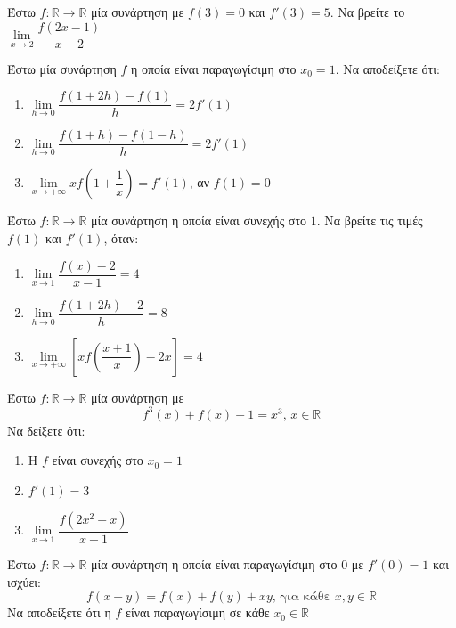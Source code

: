 \documentclass{presentation}
\begin{document}
\begin{askisi}
  Έστω $f:\mathbb{R}\to\mathbb{R}$ μία συνάρτηση με $f(3)=0$ και $f'(3)=5$. Να βρείτε το $\lim\limits_{x \to 2}{ \dfrac{f(2x-1)}{x-2} }$

\end{askisi}

\begin{askisi}
  Έστω μία συνάρτηση $f$ η οποία είναι παραγωγίσιμη στο $x_0=1$. Να αποδείξετε ότι:
  \begin{enumerate}
    \item<1-> $\lim\limits_{h \to 0}{ \dfrac{f(1+2h)-f(1)}{h} }=2f'(1)$
    \item<2-> $\lim\limits_{h \to 0}{ \dfrac{f(1+h)-f(1-h)}{h} }=2f'(1)$
    \item<3-> $\lim\limits_{x \to +\infty}{ xf\left( 1+\dfrac{1}{x} \right) }=f'(1)$, αν $f(1)=0$
  \end{enumerate}

\end{askisi}

\begin{askisi}
  Έστω $f:\mathbb{R}\to\mathbb{R}$ μία συνάρτηση η οποία είναι συνεχής στο $1$. Να βρείτε τις τιμές $f(1)$ και $f'(1)$, όταν:
  \begin{enumerate}
    \item<1-> $\lim\limits_{x \to 1}{ \dfrac{f(x)-2}{x-1} }=4$
    \item<2-> $\lim\limits_{h \to 0}{ \dfrac{f(1+2h)-2}{h} }=8$
    \item<3-> $\lim\limits_{x \to +\infty}{ \left[ xf\left( \dfrac{x+1}{x} \right)-2x   \right]=4  }$
  \end{enumerate}

\end{askisi}

\begin{askisi}
  Έστω $f:\mathbb{R}\to\mathbb{R}$ μία συνάρτηση με
  $$f^3(x)+f(x)+1=x^3 \text{, } x\in\mathbb{R}$$
  Να δείξετε ότι:
  \begin{enumerate}
    \item<1-> Η $f$ είναι συνεχής στο $x_0=1$
    \item<2-> $f'(1)=3$
    \item<3-> $\lim\limits_{x \to 1}{ \dfrac{f(2x^2-x)}{x-1}  }$
  \end{enumerate}

\end{askisi}

\begin{askisi}
  Έστω $f:\mathbb{R}\to\mathbb{R}$ μία συνάρτηση η οποία είναι παραγωγίσιμη στο $0$ με $f'(0)=1$ και ισχύει:
  $$f(x+y)=f(x)+f(y)+xy \text{, για κάθε } x,y\in\mathbb{R}$$
  Να αποδείξετε ότι η $f$ είναι παραγωγίσιμη σε κάθε $x_0\in\mathbb{R}$

\end{askisi}
\end{document}
